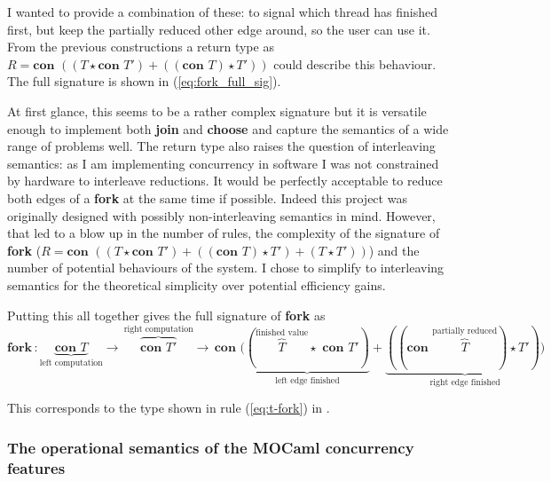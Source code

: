\documentclass[12pt,twoside,notitlepage]{report}
\theoremstyle{plain}%
\theoremstyle{definition}
\theoremstyle{remark}
\begin{document}
I wanted to provide a combination of these: to signal which thread has finished first, but keep the partially reduced other edge around, so the user can use it. From the previous constructions a return type as $ R = \textbf{con }((T\star \textbf{con } T') + ((\textbf{con } T) \star T')) $ could describe this behaviour. The full signature is shown in  (\ref{eq:fork_full_sig}).

 At first glance, this seems to be a rather complex signature but  it is versatile enough to implement both \textbf{join} and \textbf{choose} and capture the semantics of a wide range of problems well. The return type also raises the question of interleaving semantics: as I am implementing concurrency in software I was not constrained by hardware to interleave reductions. It would be perfectly acceptable to reduce both edges of a \textbf{fork} at the same time if possible. Indeed this project was originally designed with possibly non-interleaving semantics in mind. However, that led to a blow up in the number of rules, the complexity of the signature of \textbf{fork} ($ R = \textbf{con }((T\star \textbf{con } T') + ((\textbf{con } T) \star T') + (T \star T'))   $) and the number of potential behaviours of the system. I chose to simplify to interleaving semantics for the theoretical simplicity over potential efficiency gains.

Putting this all together gives the full signature of \textbf{fork} as 
\begin{equation}
\textbf{fork} \, : \!\!\!\!\! \underbrace{\textbf{con } T}_{\text{left computation}}\!\!\!\!\!\! \rightarrow \, \!\!\!\!\!\!\overbrace{\textbf{con } T'}^{\text{right computation}}\!\!\!\!\!\!\!\! \rightarrow\, \textbf{con }(\underbrace{(\!\!\!\!\!\!\overbrace{T}^{\text{finished value}}\!\!\!\!\!\!\star\,\, \textbf{con } T')}_{\text{left edge finished}} + \underbrace{((\textbf{con } \!\!\!\!\!\!\!\!\!\!\!\!\overbrace{T}^{\text{partially reduced}}\!\!\!\!\!\!\!\!\!\!) \star T'))}_{\text{right edge finished}} \tag{Fork-Full-Signature}\label{eq:fork_full_sig} \end{equation}


This corresponds to the type shown in rule (\ref{eq:t-fork}) in .

\subsubsection{The operational semantics of the MOCaml concurrency features}
\end{document}
